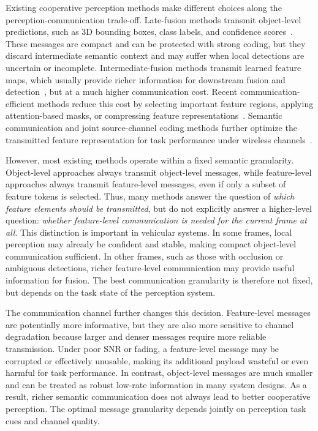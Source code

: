\documentclass[journal]{IEEEtran}
\begin{document}
Existing cooperative perception methods make different choices along the perception-communication trade-off. Late-fusion methods transmit object-level predictions, such as 3D bounding boxes, class labels, and confidence scores~\cite{xu2022opv2v}. These messages are compact and can be protected with strong coding, but they discard intermediate semantic context and may suffer when local detections are uncertain or incomplete. Intermediate-fusion methods transmit learned feature maps, which usually provide richer information for downstream fusion and detection~\cite{xu2022v2xvit,hu2022where2comm}, but at a much higher communication cost. Recent communication-efficient methods reduce this cost by selecting important feature regions, applying attention-based masks, or compressing feature representations~\cite{hu2022where2comm}. Semantic communication and joint source-channel coding methods further optimize the transmitted feature representation for task performance under wireless channels~\cite{sheng2024importance,gan2026scomcp}.

However, most existing methods operate within a fixed semantic granularity. Object-level approaches always transmit object-level messages, while feature-level approaches always transmit feature-level messages, even if only a subset of feature tokens is selected. Thus, many methods answer the question of \emph{which feature elements should be transmitted}, but do not explicitly answer a higher-level question: \emph{whether feature-level communication is needed for the current frame at all}. This distinction is important in vehicular systems. In some frames, local perception may already be confident and stable, making compact object-level communication sufficient. In other frames, such as those with occlusion or ambiguous detections, richer feature-level communication may provide useful information for fusion. The best communication granularity is therefore not fixed, but depends on the task state of the perception system.

The communication channel further changes this decision. Feature-level messages are potentially more informative, but they are also more sensitive to channel degradation because larger and denser messages require more reliable transmission. Under poor SNR or fading, a feature-level message may be corrupted or effectively unusable, making its additional payload wasteful or even harmful for task performance. In contrast, object-level messages are much smaller and can be treated as robust low-rate information in many system designs. As a result, richer semantic communication does not always lead to better cooperative perception. The optimal message granularity depends jointly on perception task cues and channel quality.
\end{document}
